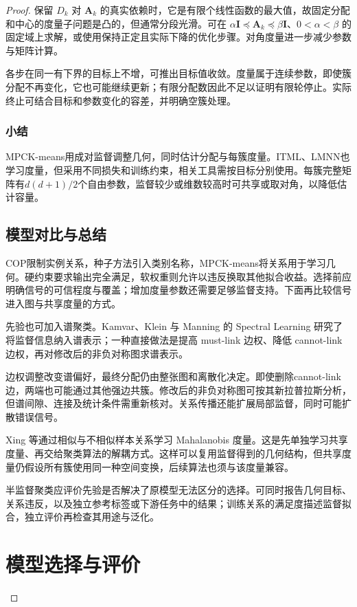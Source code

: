 \begin{proof}
保留 $D_k$ 对 $\bm{A}_k$ 的真实依赖时，它是有限个线性函数的最大值，故固定分配和中心的度量子问题是凸的，但通常分段光滑。可在 $\alpha\bm{I}\preceq\bm{A}_k\preceq\beta\bm{I}$、$0<\alpha<\beta$ 的固定域上求解，或使用保持正定且实际下降的优化步骤。对角度量进一步减少参数与矩阵计算。

各步在同一有下界的目标上不增，可推出目标值收敛。度量属于连续参数，即使簇分配不再变化，它也可能继续更新；有限分配数因此不足以证明有限轮停止。实际终止可结合目标和参数变化的容差，并明确空簇处理。

\subsubsection{小结}

MPCK-means用成对监督调整几何，同时估计分配与每簇度量。ITML、LMNN也学习度量，但采用不同损失和训练约束，相关工具需按目标分别使用。每簇完整矩阵有$d(d+1)/2$个自由参数，监督较少或维数较高时可共享或取对角，以降低估计容量。

\subsection{模型对比与总结}

COP限制实例关系，种子方法引入类别名称，MPCK-means将关系用于学习几何。硬约束要求输出完全满足，软权重则允许以违反换取其他拟合收益。选择前应明确信号的可信程度与覆盖；增加度量参数还需要足够监督支持。下面再比较信号进入图与共享度量的方式。

先验也可加入谱聚类。Kamvar、Klein 与 Manning 的 Spectral Learning 研究了将监督信息纳入谱表示；一种直接做法是提高 must-link 边权、降低 cannot-link 边权，再对修改后的非负对称图求谱表示。

边权调整改变谱偏好，最终分配仍由整张图和离散化决定。即使删除cannot-link边，两端也可能通过其他强边共簇。修改后的非负对称图可按其新拉普拉斯分析，但谱间隙、连接及统计条件需重新核对。关系传播还能扩展局部监督，同时可能扩散错误信号。

Xing 等通过相似与不相似样本关系学习 Mahalanobis 度量。这是先单独学习共享度量、再交给聚类算法的解耦方式。这样可以复用监督得到的几何结构，但共享度量仍假设所有簇使用同一种空间变换，后续算法也须与该度量兼容。

半监督聚类应评价先验是否解决了原模型无法区分的选择。可同时报告几何目标、关系违反，以及独立参考标签或下游任务中的结果；训练关系的满足度描述监督拟合，独立评价再检查其用途与泛化。

\section{模型选择与评价}
\label{sec:clustering-evaluation}


\end{proof}
